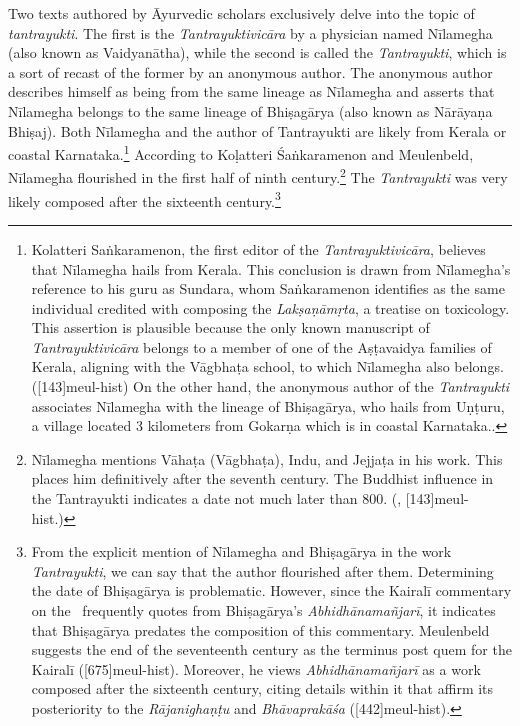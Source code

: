 Two texts authored by Āyurvedic scholars exclusively delve into the
topic of \emph{tantrayukti}. The first is the \emph{Tantrayuktivicāra}
by a physician named Nīlamegha (also known as Vaidyanātha), while the
second is called the \emph{Tantrayukti}, which is a sort of recast of
the former by an anonymous author. The anonymous author describes
himself as being from the same lineage as Nīlamegha and asserts that
Nīlamegha belongs to the same lineage of Bhiṣagārya (also known as
Nārāyaṇa Bhiṣaj). Both Nīlamegha and the author of Tantrayukti are
likely from Kerala or coastal Karnataka.\footnote{Kolatteri
Saṅkaramenon, the first editor of the \emph{Tantrayuktivicāra}, believes
that Nīlamegha hails from Kerala. This conclusion is drawn from
Nīlamegha's reference to his guru as Sundara, whom Saṅkaramenon
identifies as the same individual credited with composing the
\emph{Lakṣaṇāmṛta}, a treatise on toxicology. This assertion is
plausible because the only known manuscript of \emph{Tantrayuktivicāra}
belongs to a member of one of the Aṣṭavaidya families of Kerala,
aligning with the Vāgbhaṭa school, to which Nīlamegha also
belongs.([143]{meul-hist}) On the other hand, the
anonymous author of the \emph{Tantrayukti} associates Nīlamegha with the
lineage of Bhiṣagārya, who hails from Uṇṭuru, a village located 3
kilometers from Gokarṇa which is in coastal
Karnataka.\parencite[30]{nara-1949}.} According to Koḷatteri
Śaṅkaramenon and Meulenbeld, Nīlamegha flourished in the first half of
ninth century.\footnote{Nīlamegha mentions Vāhaṭa (Vāgbhaṭa), Indu, and
Jejjaṭa in his work.  This places him definitively after the seventh
century. The Buddhist influence in the Tantrayukti indicates a date not
much later than 800\CE.  (\cite[]{muth-1976},
[143]{meul-hist}.)} The \emph{Tantrayukti} was very likely
composed after the sixteenth century.\footnote{From the explicit mention
of Nīlamegha and Bhiṣagārya in the work \emph{Tantrayukti}, we can say
that the author flourished after them.  Determining the date of
Bhiṣagārya is problematic. However, since the Kairalī commentary on the
\AHS\ frequently quotes from Bhiṣagārya's \emph{Abhidhānamañjarī}, it
indicates that Bhiṣagārya predates the composition of this commentary.
Meulenbeld suggests the end of the seventeenth century as the terminus
post quem for the Kairalī ([675]{meul-hist}). Moreover, he
views \emph{Abhidhānamañjarī} as a work composed after the sixteenth
century, citing details within it that affirm its posteriority to the
\emph{Rājanighaṇṭu} and \emph{Bhāvaprakāśa}
([442]{meul-hist}).} 

